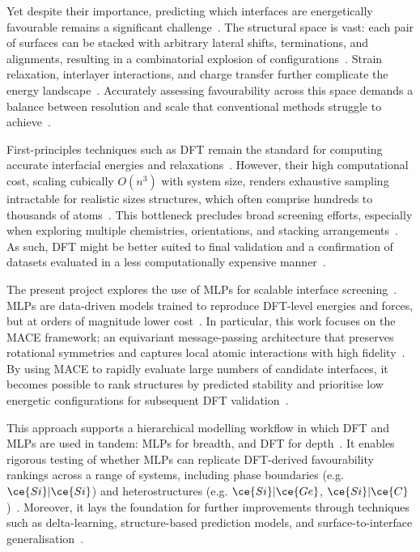 \label{interface_stability_challenge} Yet despite their importance, predicting which interfaces are energetically favourable remains a significant challenge~\nocite{}.
The structural space is vast: each pair of surfaces can be stacked with arbitrary lateral shifts, terminations, and alignments, resulting in a combinatorial explosion of configurations~\cite{Zhang2016-lt, Di_Liberto2022-gz, Gerber2023-yd}.
Strain relaxation, interlayer interactions, and charge transfer further complicate the energy landscape~\nocite{}.
Accurately assessing favourability across this space demands a balance between resolution and scale that conventional methods struggle to achieve~\cite{Gerber2023-yd, Deng2023-tg, Low2025-on}.

\label{dft_scalability_bottleneck} First-principles techniques such as DFT remain the standard for computing accurate interfacial energies and relaxations~\cite{Cervantes2025-ze}.
However, their high computational cost, scaling cubically $O(n^3)$ with system size, renders exhaustive sampling intractable for realistic sizes structures, which often comprise hundreds to thousands of atoms~\cite{Schutt2019-sz, Butler2019-ws, Rosen2022-pw}.
This bottleneck precludes broad screening efforts, especially when exploring multiple chemistries, orientations, and stacking arrangements~\nocite{}.
As such, DFT might be better suited to final validation and a confirmation of datasets evaluated in a less computationally expensive manner~\nocite{}.

\newpage \label{:mlp_screening} The present project explores the use of MLPs for scalable interface screening~\nocite{}.
MLPs are data-driven models trained to reproduce DFT-level energies and forces, but at orders of magnitude lower cost~\cite{Wang2024-tn}.
In particular, this work focuses on the MACE framework; an equivariant message-passing architecture that preserves rotational symmetries and captures local atomic interactions with high fidelity~\nocite{}.
By using MACE to rapidly evaluate large numbers of candidate interfaces, it becomes possible to rank structures by predicted stability and prioritise low energetic configurations for subsequent DFT validation~\cite{Batatia2022-xz}.

\label{hierarchical_modelling_workflow} This approach supports a hierarchical modelling workflow in which DFT and MLPs are used in tandem: MLPs for breadth, and DFT for depth~\nocite{}.
It enables rigorous testing of whether MLPs can replicate DFT-derived favourability rankings across a range of systems, including phase boundaries (e.g. $\ce{Si}|\ce{Si}$) and heterostructures (e.g. $\ce{Si}|\ce{Ge}$, $\ce{Si}|\ce{C}$)~\nocite{}.
Moreover, it lays the foundation for further improvements through techniques such as delta-learning, structure-based prediction models, and surface-to-interface generalisation~\nocite{}.

